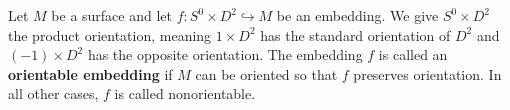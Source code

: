 Let $M$ be a surface and let $f: S^0 \times D^2 \hookrightarrow M$ be an embedding. We give $S^0 \times D^2$ the product orientation, meaning $1 \times D^2$ has the standard orientation of $D^2$ and $(-1) \times D^2$ has the opposite orientation. The embedding $f$ is called an \textbf{orientable embedding} if $M$ can be oriented so that $f$ preserves orientation. In all other cases, $f$ is called nonorientable.
